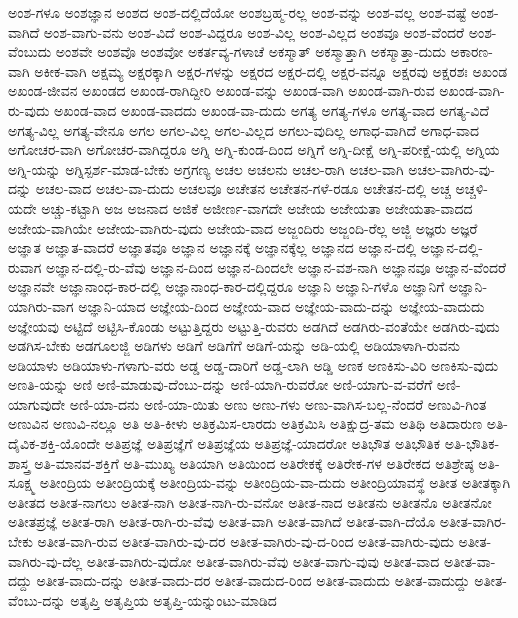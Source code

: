 {ಅಂಶ-ಗಳೂ
ಅಂಶಜ್ಞಾನ
ಅಂಶದ
ಅಂಶ-ದಲ್ಲಿದೆಯೋ
ಅಂಶಬ್ರಹ್ಮ-ರಲ್ಲ
ಅಂಶ-ವನ್ನು
ಅಂಶ-ವಲ್ಲ
ಅಂಶ-ವಷ್ಟೆ
ಅಂಶ-ವಾಗಿದೆ
ಅಂಶ-ವಾಗು-ವನು
ಅಂಶ-ವಿದೆ
ಅಂಶ-ವಿದ್ದರೂ
ಅಂಶ-ವಿಲ್ಲ
ಅಂಶ-ವಿಲ್ಲದ
ಅಂಶವೂ
ಅಂಶ-ವೆಂದರೆ
ಅಂಶ-ವೆಂಬುದು
ಅಂಶವೇ
ಅಂಶವೊ
ಅಂಶವೋ
ಅಕರ್ತವ್ಯ-ಗಳಾಚೆ
ಅಕಸ್ಮಾತ್
ಅಕಸ್ಮಾತ್ತಾಗಿ
ಅಕಸ್ಮಾತ್ತಾ-ದುದು
ಅಕಾರಣ-ವಾಗಿ
ಅಕೀಕ-ವಾಗಿ
ಅಕ್ಷಮ್ಯ
ಅಕ್ಷರಕ್ಕಾಗಿ
ಅಕ್ಷರ-ಗಳನ್ನು
ಅಕ್ಷರದ
ಅಕ್ಷರ-ದಲ್ಲಿ
ಅಕ್ಷರ-ವನ್ನೂ
ಅಕ್ಷರವು
ಅಕ್ಷರಶಃ
ಅಖಂಡ
ಅಖಂಡ-ಜೀವನ
ಅಖಂಡದ
ಅಖಂಡ-ರಾಗಿದ್ದೀರಿ
ಅಖಂಡ-ವನ್ನು
ಅಖಂಡ-ವಾಗಿ
ಅಖಂಡ-ವಾಗಿ-ರುವ
ಅಖಂಡ-ವಾಗಿ-ರು-ವುದು
ಅಖಂಡ-ವಾದ
ಅಖಂಡ-ವಾದದು
ಅಖಂಡ-ವಾ-ದುದು
ಅಗತ್ಯ
ಅಗತ್ಯ-ಗಳೂ
ಅಗತ್ಯ-ವಾದ
ಅಗತ್ಯ-ವಿದೆ
ಅಗತ್ಯ-ವಿಲ್ಲ
ಅಗತ್ಯ-ವೇನೂ
ಅಗಲ
ಅಗಲ-ವಿಲ್ಲ
ಅಗಲ-ವಿಲ್ಲದ
ಅಗಲು-ವುದಿಲ್ಲ
ಅಗಾಧ-ವಾಗಿದೆ
ಅಗಾಧ-ವಾದ
ಅಗೋಚರ-ವಾಗಿ
ಅಗೋಚರ-ವಾಗಿದ್ದರೂ
ಅಗ್ನಿ
ಅಗ್ನಿ-ಕುಂಡ-ದಿಂದ
ಅಗ್ನಿಗೆ
ಅಗ್ನಿ-ದೀಕ್ಷೆ
ಅಗ್ನಿ-ಪರೀಕ್ಷೆ-ಯಲ್ಲಿ
ಅಗ್ನಿಯ
ಅಗ್ನಿ-ಯನ್ನು
ಅಗ್ನಿಸ್ಪರ್ಶ-ಮಾಡ-ಬೇಕು
ಅಗ್ರಗಣ್ಯ
ಅಚಲ
ಅಚಲನು
ಅಚಲ-ರಾಗಿ
ಅಚಲ-ವಾಗಿ
ಅಚಲ-ವಾಗಿರು-ವು-ದನ್ನು
ಅಚಲ-ವಾದ
ಅಚಲ-ವಾ-ದುದು
ಅಚಲವೂ
ಅಚೇತನ
ಅಚೇತನ-ಗಳೆ-ರಡೂ
ಅಚೇತನ-ದಲ್ಲಿ
ಅಚ್ಚ
ಅಚ್ಚಳಿ-ಯದೇ
ಅಚ್ಚು-ಕಟ್ಟಾಗಿ
ಅಜ
ಅಜನಾದ
ಅಜಿಕೆ
ಅಜೀರ್ಣ-ವಾಗದೇ
ಅಜೇಯ
ಅಜೇಯತಾ
ಅಜೇಯತಾ-ವಾದದ
ಅಜೇಯ-ವಾಗಿಯೇ
ಅಜೇಯ-ವಾಗಿರು-ವುದು
ಅಜೇಯ-ವಾದ
ಅಜ್ಜಂದಿರು
ಅಜ್ಜಂದಿ-ರೆಲ್ಲ
ಅಜ್ಜಿ
ಅಜ್ಞರು
ಅಜ್ಞರೆ
ಅಜ್ಞಾತ
ಅಜ್ಞಾತ-ವಾದರೆ
ಅಜ್ಞಾತವೂ
ಅಜ್ಞಾನ
ಅಜ್ಞಾನಕ್ಕೆ
ಅಜ್ಞಾನಕ್ಕೆಲ್ಲ
ಅಜ್ಞಾನದ
ಅಜ್ಞಾನ-ದಲ್ಲಿ
ಅಜ್ಞಾನ-ದಲ್ಲಿ-ರುವಾಗ
ಅಜ್ಞಾನ-ದಲ್ಲಿ-ರು-ವೆವು
ಅಜ್ಞಾನ-ದಿಂದ
ಅಜ್ಞಾನ-ದಿಂದಲೇ
ಅಜ್ಞಾನ-ವಶ-ನಾಗಿ
ಅಜ್ಞಾನವೂ
ಅಜ್ಞಾನ-ವೆಂದರೆ
ಅಜ್ಞಾನವೇ
ಅಜ್ಞಾನಾಂಧ-ಕಾರ-ದಲ್ಲಿ
ಅಜ್ಞಾನಾಂಧ-ಕಾರ-ದಲ್ಲಿದ್ದರೂ
ಅಜ್ಞಾನಿ
ಅಜ್ಞಾನಿ-ಗಳೊ
ಅಜ್ಞಾನಿಗೆ
ಅಜ್ಞಾನಿ-ಯಾಗಿರು-ವಾಗ
ಅಜ್ಞಾನಿ-ಯಾದ
ಅಜ್ಞೇಯ-ದಿಂದ
ಅಜ್ಞೇಯ-ವಾದ
ಅಜ್ಞೇಯ-ವಾದು-ದನ್ನು
ಅಜ್ಞೇಯ-ವಾದುದು
ಅಜ್ಞೇಯವು
ಅಟ್ಟಿದೆ
ಅಟ್ಟಿಸಿ-ಕೊಂಡು
ಅಟ್ಟುತ್ತಿದ್ದರು
ಅಟ್ಟುತ್ತಿ-ರುವರು
ಅಡಗಿದೆ
ಅಡಗಿರು-ವಂತೆಯೇ
ಅಡಗಿರು-ವುದು
ಅಡಗಿಸ-ಬೇಕು
ಅಡಗೂಲಜ್ಜಿ
ಅಡಿಗಳು
ಅಡಿಗೆ
ಅಡಿಗೆಗೆ
ಅಡಿಗೆ-ಯನ್ನು
ಅಡಿ-ಯಲ್ಲಿ
ಅಡಿಯಾಳಾಗಿ-ರುವನು
ಅಡಿಯಾಳು
ಅಡಿಯಾಳು-ಗಳಾಗು-ವರು
ಅಡ್ಡ
ಅಡ್ಡ-ದಾರಿಗೆ
ಅಡ್ಡ-ಲಾಗಿ
ಅಡ್ಡಿ
ಅಣಕ
ಅಣಕಿಸು-ವಿರಿ
ಅಣಕಿಸು-ವುದು
ಅಣತಿ-ಯನ್ನು
ಅಣಿ
ಅಣಿ-ಮಾಡುವು-ದೆಂಬು-ದನ್ನು
ಅಣಿ-ಯಾಗಿ-ರುವರೋ
ಅಣಿ-ಯಾಗು-ವ-ವರೆಗೆ
ಅಣಿ-ಯಾಗುವುದೇ
ಅಣಿ-ಯಾ-ದನು
ಅಣಿ-ಯಾ-ಯಿತು
ಅಣು
ಅಣು-ಗಳು
ಅಣು-ವಾಗಿಸ-ಬಲ್ಲ-ನೆಂದರೆ
ಅಣುವಿ-ಗಿಂತ
ಅಣುವಿನ
ಅಣುವಿ-ನಲ್ಲೂ
ಅತಿ
ಅತಿ-ಕೀಳು
ಅತಿಕ್ರಮಿಸ-ಲಾರದು
ಅತಿಕ್ರಮಿಸಿ
ಅತಿಕ್ಷುದ್ರ-ತಮ
ಅತಿಥಿ
ಅತಿದಾರುಣ
ಅತಿ-ದೈವಿಕ-ಶಕ್ತಿ-ಯೊಂದೇ
ಅತಿಪ್ರಜ್ಞೆ
ಅತಿಪ್ರಜ್ಞೆಗೆ
ಅತಿಪ್ರಜ್ಞೆಯ
ಅತಿಪ್ರಜ್ಞೆ-ಯಾದರೋ
ಅತಿಭೌತ
ಅತಿಭೌತಿಕ
ಅತಿ-ಭೌತಿಕ-ಶಾಸ್ತ್ರ
ಅತಿ-ಮಾನವ-ಶಕ್ತಿಗೆ
ಅತಿ-ಮುಖ್ಯ
ಅತಿಯಾಗಿ
ಅತಿಯಿಂದ
ಅತಿರೇಕಕ್ಕೆ
ಅತಿರೇಕ-ಗಳ
ಅತಿರೇಕದ
ಅತಿಶ್ರೇಷ್ಠ
ಅತಿ-ಸೂಕ್ಷ್ಮ
ಅತೀಂದ್ರಿಯ
ಅತೀಂದ್ರಿಯಕ್ಕೆ
ಅತೀಂದ್ರಿಯ-ವನ್ನು
ಅತೀಂದ್ರಿಯ-ವಾ-ದುದು
ಅತೀಂದ್ರಿಯಾವಸ್ಥೆ
ಅತೀತ
ಅತೀತಕ್ಕಾಗಿ
ಅತೀತದ
ಅತೀತ-ನಾಗಲು
ಅತೀತ-ನಾಗಿ
ಅತೀತ-ನಾಗಿ-ರು-ವನೋ
ಅತೀತ-ನಾದ
ಅತೀತನು
ಅತೀತನೊ
ಅತೀತನೋ
ಅತೀತಪ್ರಜ್ಞೆ
ಅತೀತ-ರಾಗಿ
ಅತೀತ-ರಾಗಿ-ರು-ವೆವು
ಅತೀತ-ವಾಗಿ
ಅತೀತ-ವಾಗಿದೆ
ಅತೀತ-ವಾಗಿ-ದೆಯೊ
ಅತೀತ-ವಾಗಿರ-ಬೇಕು
ಅತೀತ-ವಾಗಿ-ರುವ
ಅತೀತ-ವಾಗಿರು-ವು-ದರ
ಅತೀತ-ವಾಗಿರು-ವು-ದ-ರಿಂದ
ಅತೀತ-ವಾಗಿರು-ವುದು
ಅತೀತ-ವಾಗಿರು-ವು-ದೆಲ್ಲ
ಅತೀತ-ವಾಗಿರು-ವುದೋ
ಅತೀತ-ವಾಗಿರು-ವೆವು
ಅತೀತ-ವಾಗು-ವುವು
ಅತೀತ-ವಾದ
ಅತೀತ-ವಾ-ದದ್ದು
ಅತೀತ-ವಾದು-ದನ್ನು
ಅತೀತ-ವಾದು-ದರ
ಅತೀತ-ವಾದುದ-ರಿಂದ
ಅತೀತ-ವಾದುದು
ಅತೀತ-ವಾದುದ್ದು
ಅತೀತ-ವೆಂಬು-ದನ್ನು
ಅತೃಪ್ತಿ
ಅತೃಪ್ತಿಯ
ಅತೃಪ್ತಿ-ಯನ್ನುಂಟು-ಮಾಡಿದ
}
